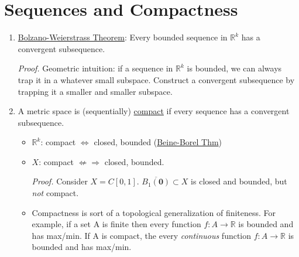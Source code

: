 \documentclass[%
 aip,
 jmp,%
 amsmath,amssymb,
 reprint,%
]{revtex4-1}
\def\R{{\mathbb R}}
\renewenvironment{proof}{\color{gray}\footnotesize\emph{Proof.}}{}
\renewcommand{\iff}{\Leftrightarrow}
\newcommand{\defn}[1]{\underline{#1}}
\newcommand{\closure}[1]{\overline{#1}}
\begin{document}
\section{Sequences and Compactness}
\begin{enumerate}
  \item \defn{Bolzano-Weierstrass Theorem}: Every bounded sequence in $\R^k$
  has a convergent subsequence.

      \begin{proof}
        Geometric intuition: if a sequence in $\R^k$ is bounded, we can always
        trap it in a whatever small subspace. Construct a convergent subsequence
        by trapping it a smaller and smaller subspace.
      \end{proof}

    \item A metric space is (sequentially) \defn{compact} if every sequence
    has a convergent subsequence.
        \begin{itemize}
          \item $\R^k$: compact $\iff$ closed, bounded (\defn{Beine-Borel Thm})
          \item $X$: compact $\not\Leftarrow\Rightarrow$ closed, bounded.

              \begin{proof}
                Consider $X=C[0,1]$. $\closure{B_1(\bm{0})} \subset X$ is
                closed and bounded, but \emph{not} compact.
              \end{proof}

          \footnotesize
          \item Compactness is sort of a topological generalization of finiteness.
          \color{gray} For example, if a set A is finite then every function
          $f:A \to \R$ is bounded and has max/min. If A is compact, the every
          \emph{continuous} function $f:A \to \R$ is bounded and has max/min.

        \end{itemize}
\end{enumerate}
\end{document}
